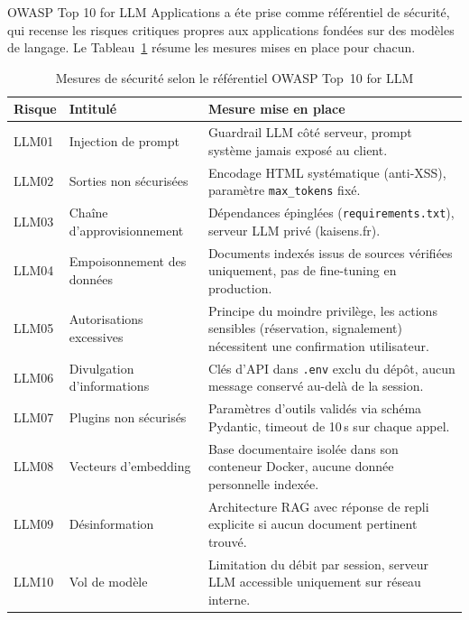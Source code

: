 OWASP Top 10 for LLM Applications \cite{owasp_llm_2025} a éte prise comme référentiel de sécurité, qui recense les risques critiques propres
aux applications fondées sur des modèles de langage.
Le Tableau~\ref{tab:owasp_mitigations} résume les mesures mises en place pour chacun.

\vspace{6pt}
\begin{table}[H]
\centering
\caption{Mesures de sécurité selon le référentiel OWASP Top~10 for LLM}
\label{tab:owasp_mitigations}
\begin{tabular}{|l|p{4cm}|p{7.5cm}|}
\hline
\textbf{Risque} & \textbf{Intitulé} & \textbf{Mesure mise en place} \\
\hline
LLM01 & Injection de prompt
  & Guardrail LLM côté serveur, prompt système jamais exposé au client. \\
\hline
LLM02 & Sorties non sécurisées
  & Encodage HTML systématique (anti-XSS), paramètre \texttt{max\_tokens} fixé. \\
\hline
LLM03 & Chaîne d'approvisionnement
  & Dépendances épinglées (\texttt{requirements.txt}), serveur LLM privé (kaisens.fr). \\
\hline
LLM04 & Empoisonnement des données
  & Documents indexés issus de sources vérifiées uniquement, pas de fine-tuning en production. \\
\hline
LLM05 & Autorisations excessives
  & Principe du moindre privilège, les actions sensibles (réservation, signalement) nécessitent une confirmation utilisateur. \\
\hline
LLM06 & Divulgation d'informations
  & Clés d'API dans \texttt{.env} exclu du dépôt, aucun message conservé au-delà de la session. \\
\hline
LLM07 & Plugins non sécurisés
  & Paramètres d'outils validés via schéma Pydantic, timeout de 10\,s sur chaque appel. \\
\hline
LLM08 & Vecteurs d'embedding
  & Base documentaire isolée dans son conteneur Docker, aucune donnée personnelle indexée. \\
\hline
LLM09 & Désinformation
  & Architecture RAG avec réponse de repli explicite si aucun document pertinent trouvé. \\
\hline
LLM10 & Vol de modèle
  & Limitation du débit par session, serveur LLM accessible uniquement sur réseau interne. \\
\hline
\end{tabular}
\end{table}

